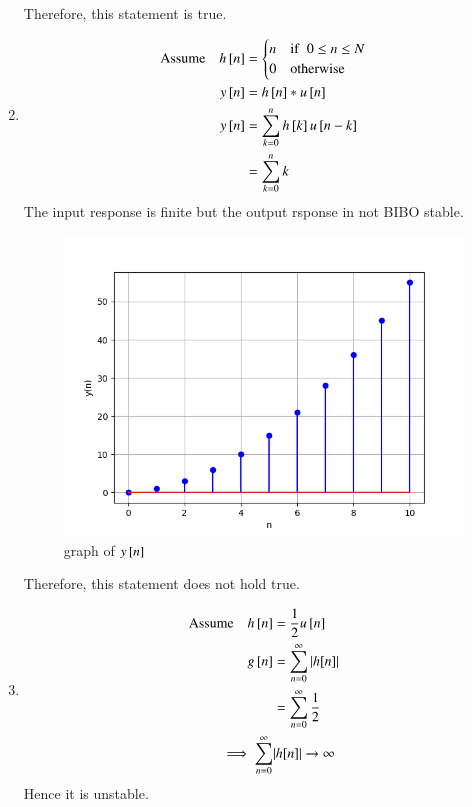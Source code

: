 \documentclass[journal,12pt,twocolumn]{IEEEtran}
\theoremstyle{remark}
\begin{document}
\begin{enumerate}
    Therefore, this statement is true.
    \item
    \begin{align}
            \text{Assume}\quad h{}\left[n\right] &= \begin{cases} 
                n & \text{if}\hspace{2mm}0 \leq n\leq N\\
                0 & \text{otherwise} \\
        \end{cases}\\
        y{}\left[n\right]&=h{}\left[n\right]*u{}\left[n\right]\\
        y{}\left[n\right] &= \sum_{k=0}^nh{}\left[k\right]u{}\left[n-k\right]\\
        &=\sum_{k=0}^nk
    \end{align}
    The input response is finite but the output rsponse in not BIBO stable.
    
    \begin{figure}[h!]
    \renewcommand\thefigure{3}
        \centering
        \includegraphics[width=0.8\linewidth]{figs/graph32.png}
        \caption{graph of $y{}\left[n\right]$}
    \end{figure}
    Therefore, this statement does not hold true.
    \item
    \begin{align}
        \text{Assume}\quad h{}\left[n\right]&=\frac{1}{2}u{}\left[n\right]\\
        g{}\left[n\right]&=\sum_{n=0}^{\infty}|h[n]|\\
        &=\sum_{n=0}^{\infty}\frac{1}{2}\\
        \implies\sum_{n=0}^{\infty}&|h[n]|\rightarrow \infty
    \end{align}
    Hence it is unstable.
    

\end{enumerate}
\end{document}

